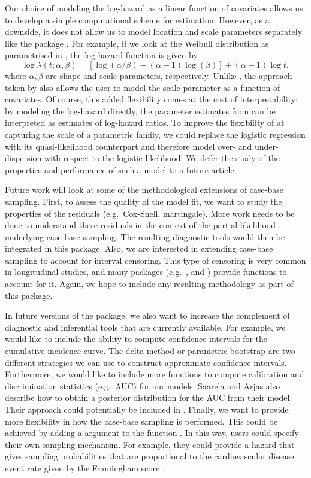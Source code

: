 \documentclass[
]{jss}
\begin{document}
Our choice of modeling the log-hazard as a linear function of covariates
allows us to develop a simple computational scheme for estimation.
However, as a downside, it does not allow us to model location and scale
parameters separately like the package . For example, if
we look at the Weibull distribution as parametrised in
, the log-hazard function is given by
\[ \log \lambda(t; \alpha, \beta) = \left[\log(\alpha/\beta) - (\alpha - 1)\log(\beta)\right] + (\alpha - 1)\log t,\]
where \(\alpha,\beta\) are shape and scale parameters, respectively.
Unlike , the approach taken by  also allows
the user to model the scale parameter as a function of covariates. Of
course, this added flexibility comes at the cost of interpretability: by
modeling the log-hazard directly, the parameter estimates from
 can be interpreted as estimates of log-hazard ratios. To
improve the flexibility of  at capturing the scale of a
parametric family, we could replace the logistic regression with its
quasi-likelihood counterpart and therefore model over- and
under-dispersion with respect to the logistic likelihood. We defer the
study of the properties and performance of such a model to a future
article.

Future work will look at some of the methodological extensions of
case-base sampling. First, to assess the quality of the model fit, we
want to study the properties of the residuals (e.g.~Cox-Snell,
martingale). More work needs to be done to understand these residuals in
the context of the partial likelihood underlying case-base sampling. The
resulting diagnostic tools would then be integrated in this package.
Also, we are interested in extending case-base sampling to account for
interval censoring. This type of censoring is very common in
longitudinal studies, and many packages (e.g.~,
 and ) provide functions to account for it.
Again, we hope to include any resulting methodology as part of this
package.

In future versions of the package, we also want to increase the
complement of diagnostic and inferential tools that are currently
available. For example, we would like to include the ability to compute
confidence intervals for the cumulative incidence curve. The delta
method or parametric bootstrap are two different strategies we can use
to construct approximate confidence intervals. Furthermore, we would
like to include more functions to compute calibration and discrimination
statistics (e.g.~AUC) for our models. Saarela and Arjas
\citeyearpar{saarela2015non} also describe how to obtain a posterior
distribution for the AUC from their model. Their approach could
potentially be included in . Finally, we want to provide
more flexibility in how the case-base sampling is performed. This could
be achieved by adding a  argument to the function
. In this way, users could specify their own
sampling mechanism. For example, they could provide a hazard that gives
sampling probabilities that are proportional to the cardiovascular
disease event rate given by the Framingham score \citep{saarela2015non}.
\end{document}
